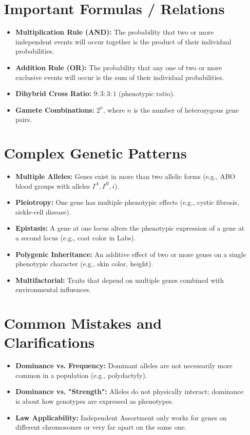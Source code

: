 \documentclass[11pt, a4paper]{article}
\begin{document}
\section*{Important Formulas / Relations}
\begin{itemize}
    \item \textbf{Multiplication Rule (AND):} The probability that two or more independent events will occur together is the product of their individual probabilities.
    \item \textbf{Addition Rule (OR):} The probability that any one of two or more exclusive events will occur is the sum of their individual probabilities.
    \item \textbf{Dihybrid Cross Ratio:} $9:3:3:1$ (phenotypic ratio).
    \item \textbf{Gamete Combinations:} $2^n$, where $n$ is the number of heterozygous gene pairs.
\end{itemize}

\section*{Complex Genetic Patterns}
\begin{itemize}
    \item \textbf{Multiple Alleles:} Genes exist in more than two allelic forms (e.g., ABO blood groups with alleles $I^A, I^B, i$).
    \item \textbf{Pleiotropy:} One gene has multiple phenotypic effects (e.g., cystic fibrosis, sickle-cell disease).
    \item \textbf{Epistasis:} A gene at one locus alters the phenotypic expression of a gene at a second locus (e.g., coat color in Labs).
    \item \textbf{Polygenic Inheritance:} An additive effect of two or more genes on a single phenotypic character (e.g., skin color, height).
    \item \textbf{Multifactorial:} Traits that depend on multiple genes combined with environmental influences.
\end{itemize}

\section*{Common Mistakes and Clarifications}
\begin{itemize}
    \item \textbf{Dominance vs. Frequency:} Dominant alleles are not necessarily more common in a population (e.g., polydactyly).
    \item \textbf{Dominance vs. "Strength":} Alleles do not physically interact; dominance is about how genotypes are expressed as phenotypes.
    \item \textbf{Law Applicability:} Independent Assortment only works for genes on different chromosomes or very far apart on the same one.
\end{itemize}
\end{document}
